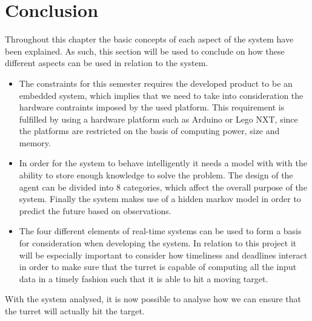 \section{Conclusion}\label{EmbConc}

Throughout this chapter the basic concepts of each aspect of the system have
been explained. As such, this section will be used to conclude on how these
different aspects can be used in relation to the \name system.

\begin{itemize}
  \item The constraints for this semester requires the developed product to be
  an embedded system, which implies that we need to take into consideration
  the hardware contraints imposed by the used platform. This requirement is
  fulfilled by using a hardware platform such as Arduino or Lego NXT, since the
  platforms are restricted on the basis of computing power, size and memory.
  \item In order for the system to behave intelligently it needs a model with
  with the ability to store enough knowledge to solve the problem. The design of
  the agent can be divided into 8 categories, which affect the overall purpose
  of the system. Finally the system makes use of a hidden markov model in order
  to predict the future based on observations.
  \item The four different elements of real-time systems can be used to form a
  basis for consideration when developing the system. In relation to this
  project it will be especially important to consider how timeliness and
  deadlines interact in order to make sure that the turret is capable of
  computing all the input data in a timely fashion such that it is able to hit a
  moving target.
\end{itemize}  

With the system analysed, it is now possible to analyse how we can ensure that
the turret will actually hit the target.


